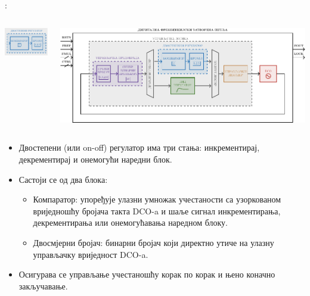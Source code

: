 \documentclass[aspectratio=169]{beamer}
\def \BBctrlColor      {RoyalBlue}
\def \DCO  {DCO} %
\begin{document}
\begin{frame}{\secname: \subsecname}
	\vspace{-0.6cm}
	\begin{columns}[t]
        \begin{column}{0.25\linewidth}
        	\begin{center}
        		\vspace{-0.2cm}
	            \includegraphics[scale=1.3]{slike/prezentacija/BB_CTRL.pdf} 
	        \end{center}
        \end{column}
        \begin{column}{0.75\linewidth}
        	\begin{center}
            	\includegraphics[scale=0.5]{slike/prezentacija/FLL.pdf}
            \end{center}
        \end{column}
    \end{columns}
    \medskip	
	\begin{itemize}
		\item Двостепени (или on-off) регулатор има три стања: инкрементирај, декрементирај и онемогући наредни блок.
		\smallskip		
		\item Састоји се од два блока:
		\begin{itemize}		
			\color{\BBctrlColor}
			\item Компаратор: упоређује улазни умножак учестаности са узоркованом вриједношћу бројача такта \DCO-a и шаље сигнал инкрементирања, декрементирања или онемогућавања наредном блоку.
			\item Двосмјерни бројач: бинарни бројач који директно утиче на улазну управљачку вриједност \DCO-a.
		\end{itemize}
		\smallskip
		\item Осигурава се управљање учестаношћу корак по корак и њено коначно закључавање.
	\end{itemize}
\end{frame}
\end{document}
